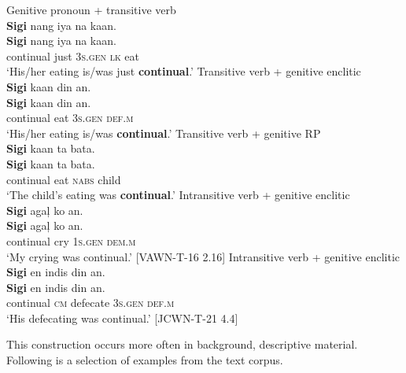 \largerpage
\ea
\label{bkm:Ref329771116}
Genitive pronoun + transitive verb \\
\textbf{Sigi}  nang  iya  na  kaan. \\\smallskip
 \gll \textbf{Sigi}  nang  iya  na  kaan. \\
continual  just  3\textsc{s.gen}  \textsc{lk}  eat \\
\glt ‘His/her eating is/was just \textbf{continual}.’
\z
\ea
Transitive verb + genitive enclitic \\
\textbf{Sigi}  kaan  din  an. \\\smallskip
\gll \textbf{Sigi}  kaan  din  an. \\
continual  eat  3\textsc{s.gen}  \textsc{def.m} \\
\glt ‘His/her eating is/was \textbf{continual}.’
\z
\ea
Transitive verb + genitive RP \\
\textbf{Sigi}  kaan  ta  bata. \\\smallskip
\gll \textbf{Sigi}  kaan  ta  bata. \\
continual  eat  \textsc{nabs}  child \\
\glt ‘The child’s eating was \textbf{continual}.’
\z
\ea
Intransitive verb + genitive enclitic \\
\textbf{Sigi}  agaļ  ko  an. \\\smallskip
 \gll \textbf{Sigi}  agaļ  ko  an. \\
continual  cry  1\textsc{s.gen}  \textsc{dem.m} \\
\glt ‘My crying was continual.’ [VAWN-T-16 2.16]
\z
\ea
Intransitive verb + genitive enclitic \\
\textbf{Sigi}  en  indis  din  an. \\\smallskip
\gll \textbf{Sigi}  en  indis  din  an. \\
continual  \textsc{cm}  defecate  3\textsc{s.gen}  \textsc{def.m} \\
\glt ‘His defecating was continual.’ [JCWN-T-21 4.4]
\z

This construction occurs more often in background, descriptive material. Following is a selection of examples from the text corpus.

